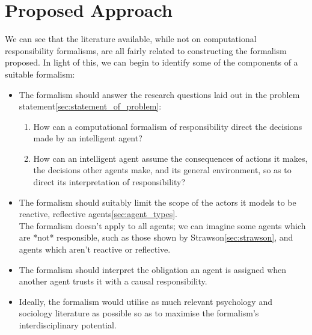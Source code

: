 \section{Proposed Approach}\label{sec:proposed_approach}

We can see that the literature available, while not on computational responsibility formalisms, are all fairly related to constructing the formalism proposed. In light of this, we can begin to identify some of the components of a suitable formalism:\par

\begin{itemize}
    \item The formalism should answer the research questions laid out in the problem statement\cref{sec:statement_of_problem}:
        \begin{enumerate}
            \item How can a computational formalism of responsibility direct the decisions made by an intelligent agent?
            \item How can an intelligent agent assume the consequences of actions it makes, the decisions other agents make, and its general environment, so as to direct its interpretation of responsibility?
        \end{enumerate}
    \item The formalism should suitably limit the scope of the actors it models to be reactive, reflective agents\cref{sec:agent_types}.\\
        The formalism doesn't apply to all agents; we can imagine some agents which are *not* responsible, such as those shown by Strawson\cref{sec:strawson}, and agents which aren't reactive or reflective.
    \item The formalism should interpret the obligation an agent is assigned when another agent trusts it with a causal responsibility.
    \item Ideally, the formalism would utilise as much relevant psychology and sociology literature as possible so as to maximise the formalism's interdisciplinary potential.
\end{itemize}

